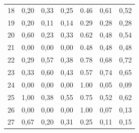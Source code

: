 \begin{table}[ht]
\begin{tabular}{l|c|c|c|c|c|c}
        18    & 0,20                                    & 0,33                                        & 0,25      &
        0.46  & 0,61                                    & 0,52                                                      \\
        19    & 0,20                                    & 0,11                                        & 0,14      &
        0.29  & 0,28                                    & 0,28                                                      \\
        20    & 0,60                                    & 0,23                                        & 0,33      &
        0.62  & 0,48                                    & 0,54                                                      \\
        21    & 0,00                                    & 0,00                                        & 0,00      &
        0.48  & 0,48                                    & 0,48                                                      \\
        22    & 0,29                                    & 0,57                                        & 0,38      &
        0.78  & 0,68                                    & 0,72                                                      \\
        23    & 0,33                                    & 0,60                                        & 0,43      &
        0.57  & 0,74                                    & 0,65                                                      \\
        24    & 0,00                                    & 0,00                                        & 0,00      &
        1.00  & 0,05                                    & 0,09                                                      \\
        25    & 1,00                                    & 0,38                                        & 0,55      &
        0.75  & 0,52                                    & 0,62                                                      \\
        26    & 0,00                                    & 0,00                                        & 0,00      &
        1.00  & 0,07                                    & 0,13                                                      \\
        27    & 0,67                                    & 0,20                                        & 0,31      &
        0.25  & 0,11                                    & 0,15                                                      \\

\end{tabular}
\end{table}
